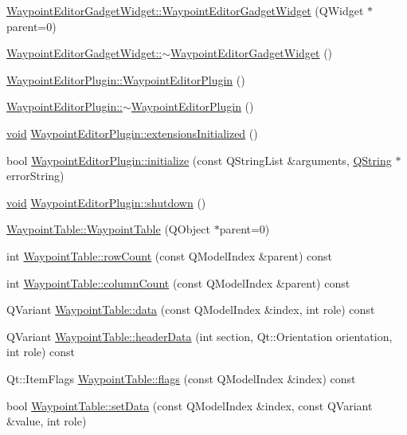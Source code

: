 \begin{DoxyCompactItemize}
\hyperlink{group___waypoint_editor_gadget_plugin_gaed1892bdb06fd69b9efd71f0490b6865}{\-Waypoint\-Editor\-Gadget\-Widget\-::\-Waypoint\-Editor\-Gadget\-Widget} (\-Q\-Widget $\ast$parent=0)
\item 
\hyperlink{group___waypoint_editor_gadget_plugin_ga6384204fc4ea3baac3ef034bec3ffd2e}{\-Waypoint\-Editor\-Gadget\-Widget\-::$\sim$\-Waypoint\-Editor\-Gadget\-Widget} ()
\item 
\hyperlink{group___waypoint_editor_gadget_plugin_gab79d5211378f7e8d1c28ac11e4a2be91}{\-Waypoint\-Editor\-Plugin\-::\-Waypoint\-Editor\-Plugin} ()
\item 
\hyperlink{group___waypoint_editor_gadget_plugin_gada6348846ef5c9b1a2778bd9ed769857}{\-Waypoint\-Editor\-Plugin\-::$\sim$\-Waypoint\-Editor\-Plugin} ()
\item 
\hyperlink{group___u_a_v_objects_plugin_ga444cf2ff3f0ecbe028adce838d373f5c}{void} \hyperlink{group___waypoint_editor_gadget_plugin_ga2df66419e41be573431fc273f596cc71}{\-Waypoint\-Editor\-Plugin\-::extensions\-Initialized} ()
\item 
bool \hyperlink{group___waypoint_editor_gadget_plugin_gaaea9c5cb6306b4ee7b48412c09660111}{\-Waypoint\-Editor\-Plugin\-::initialize} (const \-Q\-String\-List \&arguments, \hyperlink{group___u_a_v_objects_plugin_gab9d252f49c333c94a72f97ce3105a32d}{\-Q\-String} $\ast$error\-String)
\item 
\hyperlink{group___u_a_v_objects_plugin_ga444cf2ff3f0ecbe028adce838d373f5c}{void} \hyperlink{group___waypoint_editor_gadget_plugin_ga4fdf75a1aea39e6e89f5fe83b8b812f9}{\-Waypoint\-Editor\-Plugin\-::shutdown} ()
\item 
\hyperlink{group___waypoint_editor_gadget_plugin_ga62b0d5f07aaa7e091ea9b812437936a3}{\-Waypoint\-Table\-::\-Waypoint\-Table} (\-Q\-Object $\ast$parent=0)
\item 
int \hyperlink{group___waypoint_editor_gadget_plugin_ga0e60d1faba432ebe1d1e8de7c8cf02bf}{\-Waypoint\-Table\-::row\-Count} (const \-Q\-Model\-Index \&parent) const 
\item 
int \hyperlink{group___waypoint_editor_gadget_plugin_gac82408f059700c3a127f3d9a2f870d27}{\-Waypoint\-Table\-::column\-Count} (const \-Q\-Model\-Index \&parent) const 
\item 
\-Q\-Variant \hyperlink{group___waypoint_editor_gadget_plugin_ga983933a1c8fe4e9e8489d7b0f2b78461}{\-Waypoint\-Table\-::data} (const \-Q\-Model\-Index \&index, int role) const 
\item 
\-Q\-Variant \hyperlink{group___waypoint_editor_gadget_plugin_ga73be101f51619703a8a69f23849f87b6}{\-Waypoint\-Table\-::header\-Data} (int section, \-Qt\-::\-Orientation orientation, int role) const 
\item 
\-Qt\-::\-Item\-Flags \hyperlink{group___waypoint_editor_gadget_plugin_ga268c5385ef4dc152ddcee5ff2fddbaba}{\-Waypoint\-Table\-::flags} (const \-Q\-Model\-Index \&index) const 
\item 
bool \hyperlink{group___waypoint_editor_gadget_plugin_gae65ee6e837693667105fc594acc874eb}{\-Waypoint\-Table\-::set\-Data} (const \-Q\-Model\-Index \&index, const \-Q\-Variant \&value, int role)
\end{DoxyCompactItemize}
